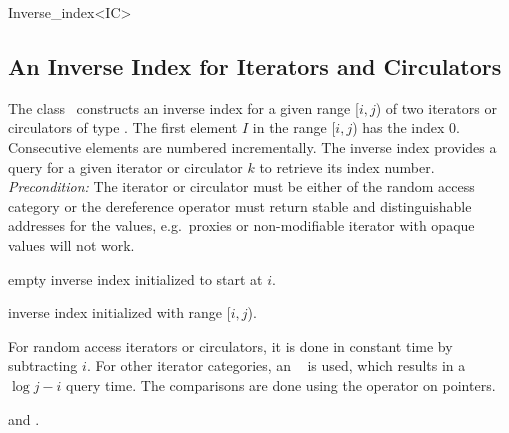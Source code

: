 \begin{ccClassTemplate}{Inverse_index<IC>}
\subsection{An Inverse Index for Iterators and Circulators}

\ccDefinition

The class \ccClassTemplateName\ constructs an inverse index for a
given range [$i,j$) of two iterators or circulators of type .
The first element $I$ in the range [$i,j$) has the index 0.
Consecutive elements are numbered incrementally. The inverse index
provides a query for a given iterator or circulator $k$ to retrieve
its index number. {\em Precondition:}\/ The iterator or circulator
must be either of the random access category or the dereference
operator must return stable and distinguishable addresses for the
values, e.g.~proxies or non-modifiable iterator with opaque values 
will not work.


\ccCreation


\ccGlue

    {empty inverse index initialized to start at $i$.}
\ccGlue

    {inverse index initialized with range [$i,j$).}

\ccOperations
{}



\ccImplementation

For random access iterators or circulators, it is done in constant
time by subtracting $i$. For other iterator categories, an \stl\
 is used, which results in a $\log j-i$ query time. The
comparisons are done using the operator \ccc{operator<} on pointers.

\ccSeeAlso

 and .

\end{ccClassTemplate}


